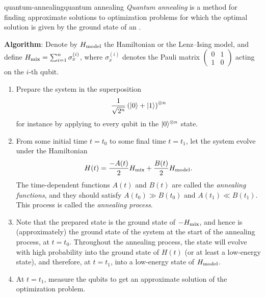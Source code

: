 \begin{topic}{quantum-annealing}{quantum annealing}
    \emph{Quantum annealing} is a method for finding approximate solutions to optimization problems for which the optimal solution is given by the ground state of an  .

    \textbf{Algorithm}: Denote by $H_\textup{model}$ the Hamiltonian or the Lenz--Ising model, and define $H_\textup{mix} = \sum_{i = 1}^{n} \sigma_x^{(i)}$, where $\sigma_x^{(i)}$ denotes the Pauli matrix $\left( \begin{smallmatrix} 0 & 1 \\ 1 & 0 \end{smallmatrix} \right)$ acting on the $i$-th qubit.
    \begin{enumerate}[label=(\arabic*)]
        \item Prepare the system in the superposition
        \[ \frac{1}{\sqrt{2^n}} \left( |0\rangle + |1\rangle \right)^{\otimes n} \]
        for instance by applying  to every qubit in the $|0\rangle^{\otimes n}$ state.
        \item From some initial time $t = t_0$ to some final time $t = t_1$, let the system evolve under the Hamiltonian
        \[ H(t) = \frac{-A(t)}{2} H_\textup{mix} + \frac{B(t)}{2} H_\textup{model} . \]
        The time-dependent functions $A(t)$ and $B(t)$ are called the \textit{annealing functions}, and they should satisfy $A(t_0) \gg B(t_0)$ and $A(t_1) \ll B(t_1)$. This process is called the \textit{annealing process}.
        \item Note that the prepared state is the ground state of $- H_\textup{mix}$, and hence is (approximately) the ground state of the system at the start of the annealing process, at $t = t_0$. Throughout the annealing process, the state will evolve with high probability into the ground state of $H(t)$ (or at least a low-energy state), and therefore, at $t = t_1$, into a low-energy state of $H_\textup{model}$.
        \item At $t = t_1$, measure the qubits to get an approximate solution of the optimization problem.
    \end{enumerate}
\end{topic}

